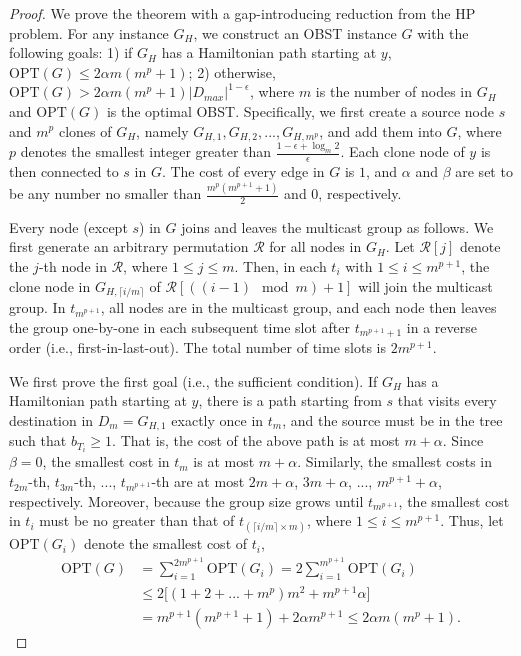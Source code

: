 \documentclass[10pt, conference, letterpaper]{IEEEtran}
\theoremstyle{definition}
\begin{document}
\begin{proof}
We prove the theorem with a gap-introducing reduction from the HP problem. For any instance $G_H$, we construct an OBST instance $G$ with the following goals: 1) if $G_{H}$ has a Hamiltonian path starting at $y$, $\mathrm{OPT}(G)\leq2\alpha m( m^{p}+1)$; 2) otherwise, $\mathrm{OPT}(G)>2\alpha m( m^{p}+1) |D_{max}|^{1-\epsilon}$, where  $m$ is the number of nodes in $G_{H}$ and $\mathrm{OPT}(G)$ is the optimal OBST. Specifically, we first create a source node $s$ and $m^p$ clones of $G_{H}$, namely $G_{H,1},G_{H,2},...,G_{H,m^p}$, and add them into $G$, where $p$ denotes the smallest integer greater than $\frac{1-\epsilon+\log_{m}2}{\epsilon}$. Each clone node of $y$ is then connected to $s$ in $G$. The cost of every edge in $G$ is $1$, and $\alpha$ and $\beta$ are set to be any number no smaller than $\frac{m^p(m^{p+1}+1)}{2}$ and $0$, respectively. 

Every node (except $s$) in $G$ joins and leaves the multicast group as follows. 
We first generate an arbitrary permutation $\mathcal{R}$ for all nodes in $G_{H}$. Let $\mathcal{R}[j]$ denote the $j$-th node in $\mathcal{R}$, where $1\leq j \leq m$.
Then, in each $t_i$ with $1\leq i \leq m^{p+1}$, the clone node in $G_{H,\lceil i/m \rceil}$ of $\mathcal{R}[((i-1)\mod m)+1]$ will join the multicast group.
In $t_{m^{p+1}}$, all nodes are in the multicast group, and each node then leaves the group one-by-one in 
each subsequent time slot after $t_{m^{p+1}+1}$
in a reverse order (i.e., first-in-last-out). The total number of time slots is $2m^{p+1}$.


We first prove the first goal (i.e., the sufficient condition). If $G_{H}$ has a Hamiltonian path starting at $y$, there is a path starting from $s$ that visits every destination in $D_m=G_{H,1}$ exactly once in $t_m$, and the source must be in the tree such that $b_{T_i}\geq 1$. That is, the cost of the above path is at most $m+\alpha$. Since $\beta=0$, the smallest cost in $t_m$ is at most $m+\alpha$. Similarly, the smallest costs in $t_{2m}$-th, $t_{3m}$-th, ..., $t_{m^{p+1}}$-th are at most $2m + \alpha$, $3m+\alpha$, ..., $m^{p+1}+\alpha$, respectively. Moreover, because the group size grows until $t_{m^{p+1}}$, the smallest cost in $t_i$ must be no greater than that of $t_{(\lceil i/m\rceil \times m)}$, where $1\leq i\leq m^{p+1}$. Thus, let $\mathrm{OPT}(G_i)$ denote the smallest cost of $t_i$,
\begin{align*}
\mathrm{OPT}(G) &= \sum_{i=1}^{2m^{p+1}}\mathrm{OPT}(G_{i}) = 2\sum_{i=1}^{m^{p+1}}\mathrm{OPT}(G_{i}) \\
                &\leq 2\big[(1+2+...+m^p)m^2+m^{p+1}\alpha\big]\\
                &= m^{p+1}(m^{p+1}+1) +2\alpha m^{p+1}\leq 2\alpha m(m^{p}+1).
\end{align*}


\end{proof}
\end{document}
